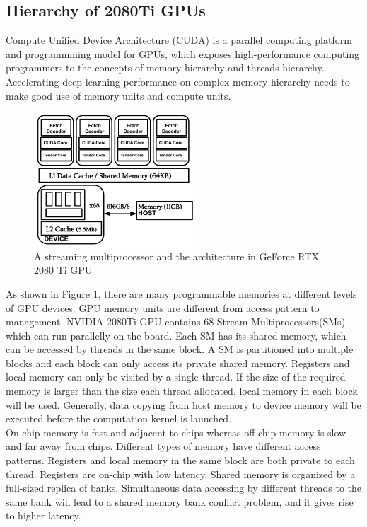\subsection{Hierarchy of 2080Ti GPUs}
Compute Unified Device Architecture (CUDA) is a parallel computing platform and programmming model for GPUs, which exposes high-performance computing programmers
to the concepts of memory hierarchy and threads hierarchy. Accelerating deep learning performance on complex memory hierarchy needs to make good use of memory
units and compute units. 
\begin{figure}[htbp]
    \centering
    \includegraphics[height=5cm, width=6cm]{figs/fig5}
    \caption{A streaming multiprocessor and the architecture in GeForce RTX 2080 Ti GPU}
    \label{fig5}
\end{figure}
As shown in Figure \ref{fig5}, there are many programmable memories at different levels of GPU devices. GPU memory units are different from access pattern to management.
NVIDIA 2080Ti GPU contains 68 Stream Multiprocessors(SMs) which can run parallelly on the board. Each SM has its shared memory, which can be accessed by threads
in the same block. A SM is partitioned into multiple blocks and each block can only access its private shared memory. Registers and local memory can only be visited
by a single thread. If the size of the required memory is larger than the size each thread allocated, local memory in each block will be used. Generally, data copying
from host memory to device memory will be executed before the computation kernel is launched. \\
On-chip memory is fast and adjacent to chips whereas off-chip memory is slow and far away from chips. Different types of memory have different access patterns.
Registers and local memory in the same block are both private to each thread. Registers are on-chip with low latency. Shared memory is organized by a full-sized 
replica of banks. Simultaneous data accessing by different threads to the same bank will lead to a shared memory bank conflict problem, and it gives rise to
higher latency. 

